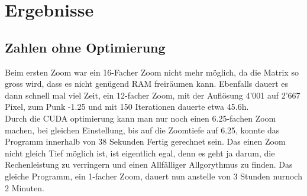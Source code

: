 \section{Ergebnisse}

\subsection{Zahlen ohne Optimierung}
Beim ersten Zoom war ein 16-Facher Zoom nicht mehr möglich, da die Matrix so gross wird, dass es nicht genügend RAM freiräumen kann. Ebenfalls dauert es dann schnell mal viel Zeit, ein 12-facher Zoom, mit der Auflösung 4'001 auf 2'667 Pixel, zum Punk -1.25 und mit 150 Iterationen dauerte etwa 45.6h.\\
Durch die CUDA optimierung kann man nur noch einen 6.25-fachen Zoom machen, bei gleichen Einstellung, bis auf die Zoomtiefe auf 6.25, konnte das Programm innerhalb von 38 Sekunden Fertig gerechnet sein. Das einen Zoom nicht gleich Tief möglich ist, ist eigentlich egal, denn es geht ja darum, die Rechenleistung zu verringern und einen Allfälliger Allgorythmus zu finden. Das gleiche Programm, ein 1-facher Zoom, dauert nun anstelle von 3 Stunden nurnoch 2 Minuten.

